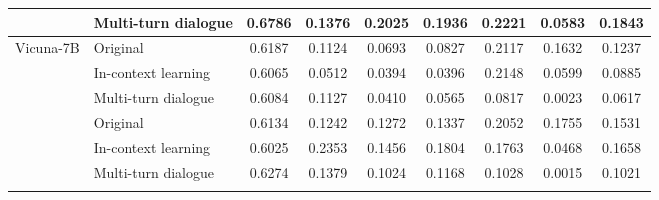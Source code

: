 \begin{table}[!t]
{\begin{tabular}{l|l|c|cccc|c|c}
 \\
& Multi-turn dialogue &  0.6786 & 0.1376 & 0.2025 & 0.1936 & 0.2221 & 0.0583 & 0.1843 \\ \midrule
\multirow{4}{*}{Vicuna-7B} & Original    & 0.6187  & 0.1124 & 0.0693 & 0.0827 & 0.2117 & 0.1632 & 0.1237 \\
& In-context learning & 0.6065 & 0.0512 & 0.0394 & 0.0396 & 0.2148 & 0.0599 & 0.0885 \\
& Multi-turn dialogue & 0.6084 & 0.1127 & 0.0410 & 0.0565 & 0.0817 & 0.0023 & 0.0617 \\
\midrule
\multirow{4}{*}{Vicuna-13B} & Original     & 0.6134 & 0.1242 & 0.1272 & 0.1337 & 0.2052 & 0.1755 & 0.1531 \\
& In-context learning & 0.6025 & 0.2353 & 0.1456 & 0.1804 & 0.1763 & 0.0468 & 0.1658 \\
& Multi-turn dialogue & 0.6274 & 0.1379 & 0.1024 & 0.1168 & 0.1028 & 0.0015 & 0.1021
 \\
\Xhline{1.0pt}
\end{tabular}
}
\label{tab:black-box}
\end{table}

